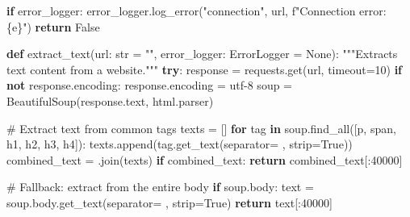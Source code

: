 \documentclass[
  titlepage]{article}
\newenvironment{Shaded}{\begin{snugshade}}{\end{snugshade}}
\newcommand{\BuiltInTok}[1]{\textcolor[rgb]{0.00,0.23,0.31}{#1}}
\newcommand{\CommentTok}[1]{\textcolor[rgb]{0.37,0.37,0.37}{#1}}
\newcommand{\ControlFlowTok}[1]{\textcolor[rgb]{0.00,0.23,0.31}{\textbf{#1}}}
\newcommand{\DecValTok}[1]{\textcolor[rgb]{0.68,0.00,0.00}{#1}}
\newcommand{\KeywordTok}[1]{\textcolor[rgb]{0.00,0.23,0.31}{\textbf{#1}}}
\newcommand{\NormalTok}[1]{\textcolor[rgb]{0.00,0.23,0.31}{#1}}
\newcommand{\OperatorTok}[1]{\textcolor[rgb]{0.37,0.37,0.37}{#1}}
\newcommand{\SpecialCharTok}[1]{\textcolor[rgb]{0.37,0.37,0.37}{#1}}
\newcommand{\SpecialStringTok}[1]{\textcolor[rgb]{0.13,0.47,0.30}{#1}}
\newcommand{\StringTok}[1]{\textcolor[rgb]{0.13,0.47,0.30}{#1}}
\newcommand{\VariableTok}[1]{\textcolor[rgb]{0.07,0.07,0.07}{#1}}
\begin{document}
\begin{Shaded}
\begin{Highlighting}[]
        \ControlFlowTok{if}\NormalTok{ error\_logger:}
\NormalTok{            error\_logger.log\_error(}\StringTok{"connection"}\NormalTok{, url, }\SpecialStringTok{f"Connection error: }\SpecialCharTok{\{}\NormalTok{e}\SpecialCharTok{\}}\SpecialStringTok{"}\NormalTok{)}
        \ControlFlowTok{return} \VariableTok{False}
\end{Highlighting}
\end{Shaded}

\begin{Shaded}
\begin{Highlighting}[]
\KeywordTok{def}\NormalTok{ extract\_text(url: }\BuiltInTok{str} \OperatorTok{=} \StringTok{""}\NormalTok{, error\_logger: ErrorLogger }\OperatorTok{=} \VariableTok{None}\NormalTok{):}
    \CommentTok{"""Extracts text content from a website."""}
    \ControlFlowTok{try}\NormalTok{:}
\NormalTok{        response }\OperatorTok{=}\NormalTok{ requests.get(url, timeout}\OperatorTok{=}\DecValTok{10}\NormalTok{)}
        \ControlFlowTok{if} \KeywordTok{not}\NormalTok{ response.encoding:}
\NormalTok{            response.encoding }\OperatorTok{=} \StringTok{\textquotesingle{}utf{-}8\textquotesingle{}}
\NormalTok{        soup }\OperatorTok{=}\NormalTok{ BeautifulSoup(response.text, }\StringTok{\textquotesingle{}html.parser\textquotesingle{}}\NormalTok{)}

        \CommentTok{\# Extract text from common tags}
\NormalTok{        texts }\OperatorTok{=}\NormalTok{ []}
        \ControlFlowTok{for}\NormalTok{ tag }\KeywordTok{in}\NormalTok{ soup.find\_all([}\StringTok{\textquotesingle{}p\textquotesingle{}}\NormalTok{, }\StringTok{\textquotesingle{}span\textquotesingle{}}\NormalTok{, }\StringTok{\textquotesingle{}h1\textquotesingle{}}\NormalTok{, }\StringTok{\textquotesingle{}h2\textquotesingle{}}\NormalTok{, }\StringTok{\textquotesingle{}h3\textquotesingle{}}\NormalTok{, }\StringTok{\textquotesingle{}h4\textquotesingle{}}\NormalTok{]):}
\NormalTok{            texts.append(tag.get\_text(separator}\OperatorTok{=}\StringTok{\textquotesingle{} \textquotesingle{}}\NormalTok{, strip}\OperatorTok{=}\VariableTok{True}\NormalTok{))}
\NormalTok{        combined\_text }\OperatorTok{=} \StringTok{\textquotesingle{} \textquotesingle{}}\NormalTok{.join(texts)}
        \ControlFlowTok{if}\NormalTok{ combined\_text:}
            \ControlFlowTok{return}\NormalTok{ combined\_text[:}\DecValTok{40000}\NormalTok{]}

        \CommentTok{\# Fallback: extract from the entire body}
        \ControlFlowTok{if}\NormalTok{ soup.body:}
\NormalTok{            text }\OperatorTok{=}\NormalTok{ soup.body.get\_text(separator}\OperatorTok{=}\StringTok{\textquotesingle{} \textquotesingle{}}\NormalTok{, strip}\OperatorTok{=}\VariableTok{True}\NormalTok{)}
            \ControlFlowTok{return}\NormalTok{ text[:}\DecValTok{40000}\NormalTok{]}


\end{Highlighting}
\end{Shaded}
\end{document}
